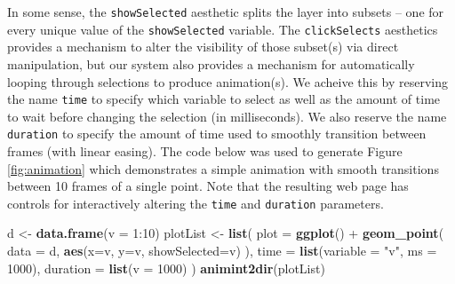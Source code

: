 \documentclass[12pt,]{isuthesis}
\newenvironment{Shaded}{\begin{snugshade}}{\end{snugshade}}
\newcommand{\KeywordTok}[1]{\textcolor[rgb]{0.13,0.29,0.53}{\textbf{{#1}}}}
\newcommand{\DataTypeTok}[1]{\textcolor[rgb]{0.13,0.29,0.53}{{#1}}}
\newcommand{\DecValTok}[1]{\textcolor[rgb]{0.00,0.00,0.81}{{#1}}}
\newcommand{\StringTok}[1]{\textcolor[rgb]{0.31,0.60,0.02}{{#1}}}
\newcommand{\NormalTok}[1]{{#1}}
\begin{document}
In some sense, the \texttt{showSelected} aesthetic splits the layer into
subsets -- one for every unique value of the \texttt{showSelected}
variable. The \texttt{clickSelects} aesthetics provides a mechanism to
alter the visibility of those subset(s) via direct manipulation, but our
system also provides a mechanism for automatically looping through
selections to produce animation(s). We acheive this by reserving the
name \texttt{time} to specify which variable to select as well as the
amount of time to wait before changing the selection (in milliseconds).
We also reserve the name \texttt{duration} to specify the amount of time
used to smoothly transition between frames (with linear easing). The
code below was used to generate Figure \ref{fig:animation} which
demonstrates a simple animation with smooth transitions between 10
frames of a single point. Note that the resulting web page has controls
for interactively altering the \texttt{time} and \texttt{duration}
parameters.

\begin{Shaded}
\begin{Highlighting}[]
\NormalTok{d <-}\StringTok{ }\KeywordTok{data.frame}\NormalTok{(}\DataTypeTok{v =} \DecValTok{1}\NormalTok{:}\DecValTok{10}\NormalTok{)}
\NormalTok{plotList <-}\StringTok{ }\KeywordTok{list}\NormalTok{(}
  \DataTypeTok{plot =} \KeywordTok{ggplot}\NormalTok{() +}\StringTok{ }\KeywordTok{geom_point}\NormalTok{(}
    \DataTypeTok{data =} \NormalTok{d, }\KeywordTok{aes}\NormalTok{(}\DataTypeTok{x=}\NormalTok{v, }\DataTypeTok{y=}\NormalTok{v, }\DataTypeTok{showSelected=}\NormalTok{v)}
  \NormalTok{),}
  \DataTypeTok{time =} \KeywordTok{list}\NormalTok{(}\DataTypeTok{variable =} \StringTok{"v"}\NormalTok{, }\DataTypeTok{ms =} \DecValTok{1000}\NormalTok{),}
  \DataTypeTok{duration =} \KeywordTok{list}\NormalTok{(}\DataTypeTok{v =} \DecValTok{1000}\NormalTok{)}
\NormalTok{)}
\KeywordTok{animint2dir}\NormalTok{(plotList)}
\end{Highlighting}
\end{Shaded}
\end{document}
